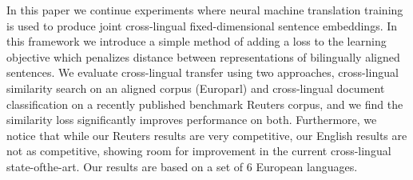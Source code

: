 In this paper we continue experiments where neural machine translation training is used to produce joint cross-lingual fixed-dimensional sentence embeddings. In this framework we introduce a simple method of adding a loss to the learning objective which penalizes distance between representations of bilingually aligned sentences. We evaluate cross-lingual transfer using two approaches, cross-lingual similarity search on an aligned corpus (Europarl) and cross-lingual document classification on a recently published benchmark Reuters corpus, and we find the similarity loss significantly improves performance on both. Furthermore, we notice that while our Reuters results are very competitive, our English results are not as competitive, showing room for improvement in the current cross-lingual state-ofthe-art. Our results are based on a set of 6 European languages.
